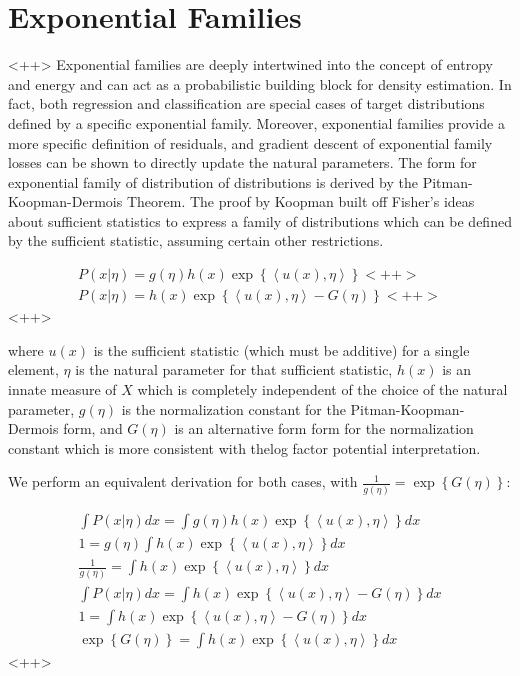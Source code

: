 \documentclass[a4paper]{article}
\begin{document}
\section{Exponential Families}<++>
	Exponential families are deeply intertwined into the concept of entropy and energy and can act as a probabilistic building block for density estimation. 
In fact, both regression and classification are special cases of target distributions defined by a specific exponential family. 
Moreover, exponential families provide a more specific definition of residuals, and gradient descent of exponential family losses can be shown to directly update the natural parameters.
	The form for exponential family of distribution of distributions is derived by the Pitman-Koopman-Dermois Theorem. The proof by Koopman built off Fisher's ideas about sufficient statistics to express a family of distributions which can be defined by the sufficient statistic, assuming certain other restrictions.

\begin{equation}
  \begin{split}
    P \left(x \vert \eta \right) = g(\eta) h(x) \exp\left\{  \left< u(x), \eta \right> \right\}<++> \\
    P \left(x \vert \eta \right) =  h(x) \exp\left\{  \left< u(x), \eta \right> - G(\eta) \right\}<++>
   \end{split}
  \label{<++>}
\end{equation}<++>

where $u(x)$ is the sufficient statistic (which must be additive) for a single element, $\eta$ is the natural parameter for that sufficient statistic, $h(x)$ is an innate measure of $X$ which is completely independent of the choice of the natural parameter, 
$g(\eta)$ is the normalization constant for the Pitman-Koopman-Dermois form, and $G(\eta)$ is an alternative form form for the normalization constant which is more consistent with thelog factor potential interpretation.

We perform an equivalent derivation for both cases, with $ \frac{1}{g(\eta)} = \exp\left\{ G(\eta) \right\}$:

\begin{equation}
  \begin{split}
    \int P \left(x \vert \eta \right) dx = \int g(\eta) h(x) \exp\left\{  \left< u(x), \eta \right> \right\} dx \\
    1 = g(\eta) \int h(x) \exp\left\{  \left< u(x), \eta \right> \right\} dx \\
    \frac{1}{g(\eta)} = \int h(x) \exp\left\{  \left< u(x), \eta \right> \right\} dx \\
    \int P \left(x \vert \eta \right) dx =  \int h(x) \exp\left\{  \left< u(x), \eta \right> - G(\eta) \right\} dx \\
    1 = \int h(x) \exp\left\{  \left< u(x), \eta \right> - G(\eta) \right\} dx \\
    \exp \left\{ G(\eta) \right\} = \int h(x) \exp \left\{ \left< u(x), \eta \right> \right\} dx
  \end{split}
  \label{<++>}
\end{equation}<++>
\end{document}

